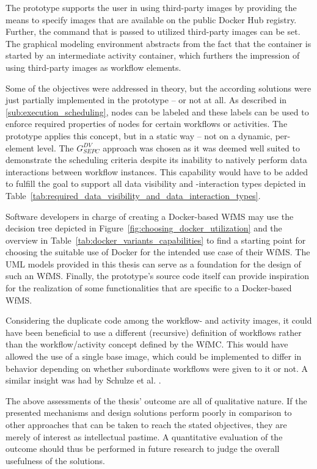   The prototype supports the user in using third-party images by providing the means to specify images that are available on the public Docker Hub registry. Further, the command that is passed to utilized third-party images can be set. The graphical modeling environment abstracts from the fact that the container is started by an intermediate activity container, which furthers the impression of using third-party images as workflow elements.

  Some of the objectives were addressed in theory, but the according solutions were just partially implemented in the prototype -- or not at all.
  As described in \ref{sub:execution_scheduling}, nodes can be labeled and these labels can be used to enforce required properties of nodes for certain workflows or activities.
  The prototype applies this concept, but in a static way -- not on a dynamic, per-element level.
  The $G_{SEPC}^{DV}$ approach was chosen as it was deemed well suited to demonstrate the scheduling criteria despite its inability to natively perform data interactions between workflow instances. This capability would have to be added to fulfill the goal to support all data visibility and -interaction types depicted in Table~\ref{tab:required_data_visibility_and_data_interaction_types}.

  Software developers in charge of creating a Docker-based \ac{WfMS} may use the decision tree depicted in Figure~\ref{fig:choosing_docker_utilization} and the overview in Table~\ref{tab:docker_variants_capabilities} to find a starting point for choosing the suitable use of Docker for the intended use case of their \ac{WfMS}. The UML models provided in this thesis can serve as a foundation for the design of such an \ac{WfMS}. Finally, the prototype's source code itself can provide inspiration for the realization of some functionalities that are specific to a Docker-based \ac{WfMS}.

  Considering the duplicate code among the workflow- and activity images, it could have been beneficial to use a different (recursive) definition of workflows rather than the workflow/activity concept defined by the \ac{WfMC}. This would have allowed the use of a single base image, which could be implemented to differ in behavior depending on whether subordinate workflows were given to it or not. A similar insight was had by Schulze et al. \cite[p.~119]{Schulze1998Services}.

  The above assessments of the thesis' outcome are all of qualitative nature. If the presented mechanisms and design solutions perform poorly in comparison to other approaches that can be taken to reach the stated objectives, they are merely of interest as intellectual pastime. A quantitative evaluation of the outcome should thus be performed in future research to judge the overall usefulness of the solutions.

